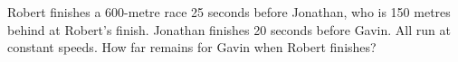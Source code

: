 Robert finishes a 600-metre race 25 seconds before Jonathan, who is 150 metres behind at Robert's finish. Jonathan finishes 20 seconds before Gavin. All run at constant speeds. How far remains for Gavin when Robert finishes?

